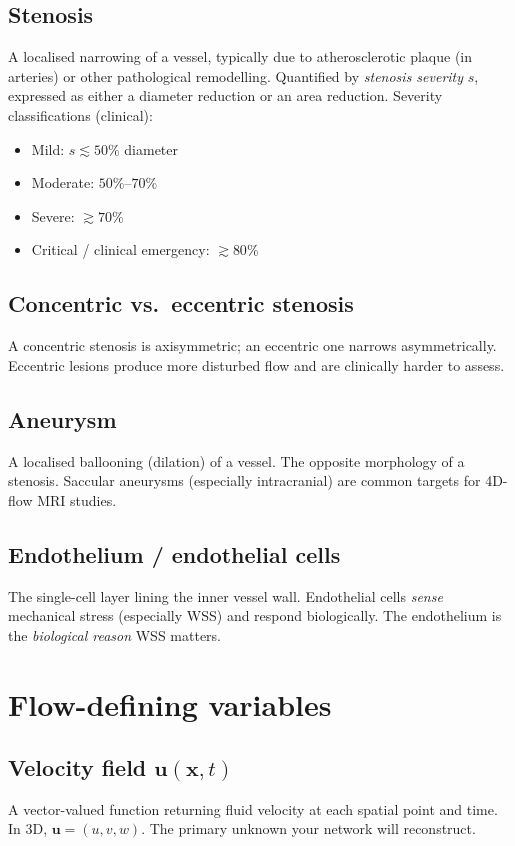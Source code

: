 \documentclass[11pt]{article}
\begin{document}
\subsection*{Stenosis}
A localised narrowing of a vessel, typically due to atherosclerotic plaque (in arteries) or other pathological remodelling. Quantified by \emph{stenosis severity} $s$, expressed as either a diameter reduction or an area reduction. Severity classifications (clinical):
\begin{itemize}[noitemsep]
  \item Mild: $s \lesssim 50\%$ diameter
  \item Moderate: $50\%$--$70\%$
  \item Severe: $\gtrsim 70\%$
  \item Critical / clinical emergency: $\gtrsim 80\%$
\end{itemize}

\subsection*{Concentric vs.\ eccentric stenosis}
A concentric stenosis is axisymmetric; an eccentric one narrows asymmetrically. Eccentric lesions produce more disturbed flow and are clinically harder to assess.

\subsection*{Aneurysm}
A localised ballooning (dilation) of a vessel. The opposite morphology of a stenosis. Saccular aneurysms (especially intracranial) are common targets for 4D-flow MRI studies.

\subsection*{Endothelium / endothelial cells}
The single-cell layer lining the inner vessel wall. Endothelial cells \emph{sense} mechanical stress (especially WSS) and respond biologically. The endothelium is the \emph{biological reason} WSS matters.

\section{Flow-defining variables}

\subsection*{Velocity field $\mathbf{u}(\mathbf{x},t)$}
A vector-valued function returning fluid velocity at each spatial point and time. In 3D, $\mathbf{u} = (u, v, w)$. The primary unknown your network will reconstruct.
\end{document}

